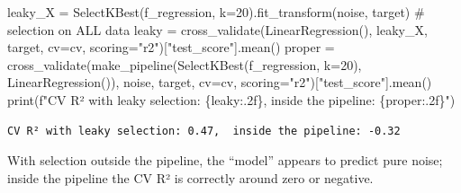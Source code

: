 \documentclass[
  letterpaper,
  DIV=11,
  numbers=noendperiod]{scrreprt}
\newenvironment{Shaded}{\begin{snugshade}}{\end{snugshade}}
\newcommand{\BuiltInTok}[1]{\textcolor[rgb]{0.00,0.23,0.31}{#1}}
\newcommand{\CommentTok}[1]{\textcolor[rgb]{0.37,0.37,0.37}{#1}}
\newcommand{\DecValTok}[1]{\textcolor[rgb]{0.68,0.00,0.00}{#1}}
\newcommand{\NormalTok}[1]{\textcolor[rgb]{0.00,0.23,0.31}{#1}}
\newcommand{\OperatorTok}[1]{\textcolor[rgb]{0.37,0.37,0.37}{#1}}
\newcommand{\SpecialCharTok}[1]{\textcolor[rgb]{0.37,0.37,0.37}{#1}}
\newcommand{\SpecialStringTok}[1]{\textcolor[rgb]{0.13,0.47,0.30}{#1}}
\newcommand{\StringTok}[1]{\textcolor[rgb]{0.13,0.47,0.30}{#1}}
\begin{document}
\begin{tcolorbox}
\begin{Shaded}
\begin{Highlighting}[]
\NormalTok{leaky\_X }\OperatorTok{=}\NormalTok{ SelectKBest(f\_regression, k}\OperatorTok{=}\DecValTok{20}\NormalTok{).fit\_transform(noise, target)   }\CommentTok{\# selection on ALL data}
\NormalTok{leaky }\OperatorTok{=}\NormalTok{ cross\_validate(LinearRegression(), leaky\_X, target, cv}\OperatorTok{=}\NormalTok{cv, scoring}\OperatorTok{=}\StringTok{"r2"}\NormalTok{)[}\StringTok{"test\_score"}\NormalTok{].mean()}
\NormalTok{proper }\OperatorTok{=}\NormalTok{ cross\_validate(make\_pipeline(SelectKBest(f\_regression, k}\OperatorTok{=}\DecValTok{20}\NormalTok{), LinearRegression()),}
\NormalTok{                        noise, target, cv}\OperatorTok{=}\NormalTok{cv, scoring}\OperatorTok{=}\StringTok{"r2"}\NormalTok{)[}\StringTok{"test\_score"}\NormalTok{].mean()}
\BuiltInTok{print}\NormalTok{(}\SpecialStringTok{f"CV R² with leaky selection: }\SpecialCharTok{\{}\NormalTok{leaky}\SpecialCharTok{:.2f\}}\SpecialStringTok{,  inside the pipeline: }\SpecialCharTok{\{}\NormalTok{proper}\SpecialCharTok{:.2f\}}\SpecialStringTok{"}\NormalTok{)}
\end{Highlighting}
\end{Shaded}

\begin{verbatim}
CV R² with leaky selection: 0.47,  inside the pipeline: -0.32
\end{verbatim}

With selection outside the pipeline, the ``model'' appears to predict
pure noise; inside the pipeline the CV R² is correctly around zero or
negative.

\end{tcolorbox}
\end{document}

